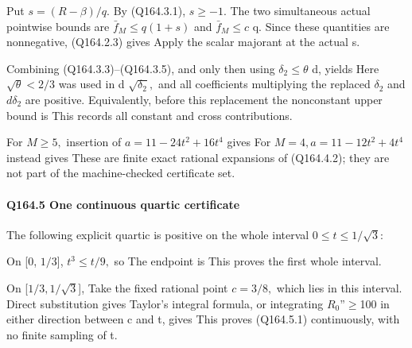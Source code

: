 Put \(s=(R-\beta)/q.\) By (Q164.3.1), \(s\ge -1.\) The two simultaneous actual
pointwise bounds are \(\bar f_{M}\le q(1+s)\) and \(\bar f_{M}\le c\) q.
Since these quantities are nonnegative, (Q164.2.3) gives
Apply the scalar majorant at the actual s.

Combining (Q164.3.3)--(Q164.3.5), and only then using \(\delta_2\le \theta\) d, yields
Here \(\sqrt{\theta}<2/3\) was used in d \(\sqrt{\delta_2},\allowbreak \) and all coefficients
multiplying the replaced \(\delta_2\) and \(d\delta_2\) are positive.
Equivalently, before this replacement the nonconstant upper bound is
This records all constant and cross contributions.

For \(M\ge 5,\allowbreak \) insertion of \(a=11-24t^2+16t^4\) gives
For \(M=4,\allowbreak  a=11-12t^2+4t^4\) instead gives
These are finite exact rational expansions of (Q164.4.2); they are not part
of the machine-checked certificate set.

\paragraph{Q164.5 One continuous quartic certificate}

The following explicit quartic is positive on the whole interval
\(0\le t\le 1/\sqrt{3}:\)

On [0, \(1/3\)], \(t^3\le t/9,\allowbreak \) so
The endpoint is
This proves the first whole interval.

On [\(1/3,\allowbreak  1/\sqrt{3}\)],
Take the fixed rational point \(c=3/8,\allowbreak \) which lies in this interval.
Direct substitution gives
Taylor's integral formula, or integrating \(R_0\)''\ensuremath{\ge}100 in either
direction between c and t, gives
This proves (Q164.5.1) continuously, with no finite sampling of t.

